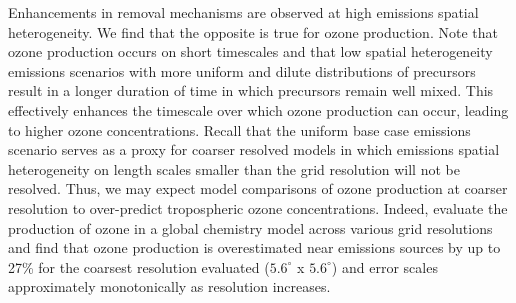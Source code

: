 Enhancements in removal mechanisms are observed at high emissions spatial heterogeneity. We find that the opposite is true for ozone production. Note that ozone production occurs on short timescales and that low spatial heterogeneity emissions scenarios with more uniform and dilute distributions of precursors result in a longer duration of time in which precursors remain well mixed. This effectively enhances the timescale over which ozone production can occur, leading to higher ozone concentrations. Recall that the uniform base case emissions scenario serves as a proxy for coarser resolved models in which emissions spatial heterogeneity on length scales smaller than the grid resolution will not be resolved. Thus, we may expect model comparisons of ozone production at coarser resolution to over-predict tropospheric ozone concentrations. Indeed, \cite{wild_global_2006} evaluate the production of ozone in a global chemistry model across various grid resolutions and find that ozone production is overestimated near emissions sources by up to 27\% for the coarsest resolution evaluated ($5.6^{\circ}$ x $5.6^{\circ}$) and error scales approximately monotonically as resolution increases. 






